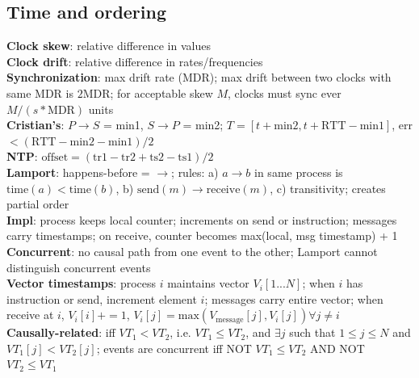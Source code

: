 \documentclass{article}
\begin{document}
\begin{multicols*}{3}
\section{Time and ordering}
\textbf{Clock skew}: relative difference in values \\
\textbf{Clock drift}: relative difference in rates/frequencies \\
\textbf{Synchronization}: max drift rate (MDR); max drift between two clocks with same MDR is $2\text{MDR}$; for acceptable skew $M$, clocks must sync ever $M/(s*\text{MDR})$ units \\
\textbf{Cristian's}: $P\rightarrow S$ = min1, $S\rightarrow P$ = min2; $T = [t + \text{min2}, t + \text{RTT} - \text{min1}]$, err $< (\text{RTT}-\text{min2}-\text{min1})/2$ \\
\textbf{NTP}: $\text{offset} = (\text{tr1} - \text{tr2} + \text{ts2} - \text{ts1})/2$ \\
\textbf{Lamport}: happens-before = $\rightarrow$; rules: a) $a \rightarrow b$ in same process is $\text{time}(a) < \text{time}(b)$, b) $\text{send}(m) \rightarrow \text{receive}(m)$, c) transitivity; creates partial order \\
\textbf{Impl}: process keeps local counter; increments on send or instruction; messages carry timestamps; on receive, counter becomes max(local, msg timestamp) + 1 \\
\textbf{Concurrent}: no causal path from one event to the other; Lamport cannot distinguish concurrent events \\
\textbf{Vector timestamps}: process $i$ maintains vector $V_i[1...N]$; when $i$ has instruction or send, increment element $i$; messages carry entire vector; when receive at $i$, $V_i[i] += 1$, $V_i[j] = \text{max}(V_\text{message}[j], V_i[j]) \forall j \neq i$ \\
\textbf{Causally-related}: iff $VT_1 < VT_2$, i.e. $VT_1 \leq VT_2$, and $\exists j$ such that $1 \leq j \leq N$ and $VT_1[j] < VT_2[j]$; events are concurrent iff NOT $VT_1 \leq VT_2$ AND NOT $VT_2 \leq VT_1$


\end{multicols*}
\end{document}
